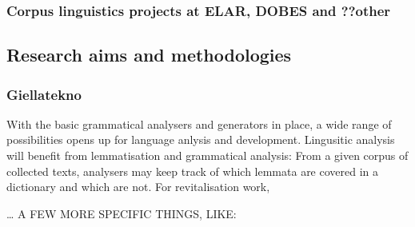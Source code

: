 \documentclass[a4paper,12pt]{article}
\begin{document}
\subsubsection{Corpus linguistics projects at ELAR, DOBES and ??other}

\subsection{Research aims and methodologies}

\subsubsection{Giellatekno} 


With the basic grammatical analysers and generators in place, a wide range of possibilities opens up for language anlysis and development. Lingusitic analysis will benefit from lemmatisation and grammatical analysis: From a given corpus of collected texts, analysers may keep track of which lemmata are covered in a dictionary and which are not. For revitalisation work, 

… A FEW MORE SPECIFIC THINGS, LIKE:
\end{document}

